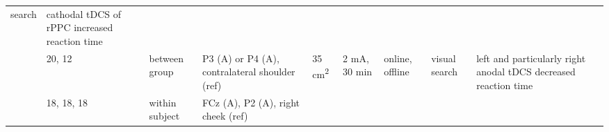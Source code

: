 \documentclass[11pt,english,]{memoir}
\begin{document}
\begin{longtable}[]{@{}lllllllll@{}}
\begin{minipage}[t]{0.06\columnwidth}
search\strut
\end{minipage} & \begin{minipage}[t]{0.25\columnwidth}\raggedright
cathodal tDCS of rPPC increased reaction time\strut
\end{minipage}\tabularnewline
\begin{minipage}[t]{0.08\columnwidth}\raggedright
\textcite{Bolognini2010}\strut
\end{minipage} & \begin{minipage}[t]{0.03\columnwidth}\raggedright
20,
12\strut
\end{minipage} & \begin{minipage}[t]{0.05\columnwidth}\raggedright
between
group\strut
\end{minipage} & \begin{minipage}[t]{0.15\columnwidth}\raggedright
P3 (A) or P4 (A),
contralateral shoulder (ref)\strut
\end{minipage} & \begin{minipage}[t]{0.04\columnwidth}\raggedright
35
cm\textsuperscript{2}\strut
\end{minipage} & \begin{minipage}[t]{0.06\columnwidth}\raggedright
2 mA, 30
min\strut
\end{minipage} & \begin{minipage}[t]{0.05\columnwidth}\raggedright
online,
offline\strut
\end{minipage} & \begin{minipage}[t]{0.06\columnwidth}\raggedright
visual
search\strut
\end{minipage} & \begin{minipage}[t]{0.25\columnwidth}\raggedright
left and particularly right anodal tDCS decreased
reaction time\strut
\end{minipage}\tabularnewline
\begin{minipage}[t]{0.08\columnwidth}\raggedright
\textcite{Reinhart2015}\strut
\end{minipage} & \begin{minipage}[t]{0.03\columnwidth}\raggedright
18,
18,
18\strut
\end{minipage} & \begin{minipage}[t]{0.05\columnwidth}\raggedright
within
subject\strut
\end{minipage} & \begin{minipage}[t]{0.15\columnwidth}\raggedright
FCz (A), P2 (A), right cheek
(ref)\strut
\end{minipage} & \begin{minipage}[t]{0.04\columnwidth}\raggedright

\end{minipage}
\end{longtable}
\end{document}
